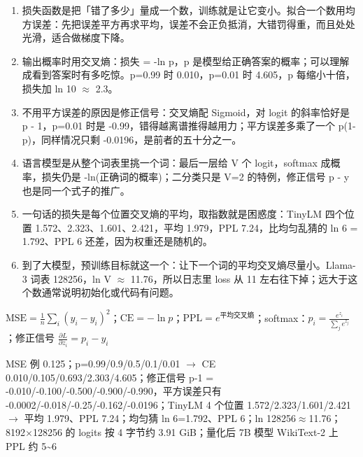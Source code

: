 \documentclass[UTF8,10.5pt,openany]{ctexbook}
\newcommand{\qlabel}[1]{{\sffamily\footnotesize\bfseries\color{accent}#1}\;}
\newcommand{\numline}[2]{\vspace{2pt}\noindent{\qlabel{#1}}%
  \begingroup\sloppy\raggedright{\sffamily\footnotesize\color{grayt}#2\par}\endgroup}
\begin{document}
\noindent{\qlabel{答}}\begingroup\sloppy\begin{enumerate}[leftmargin=1.6em,itemsep=2.5pt,topsep=0pt,parsep=0pt,label={\sffamily\footnotesize\color{accent}\arabic*.}]
\item {\fontsize{10}{14.8}\selectfont 损失函数是把「错了多少」量成一个数，训练就是让它变小。拟合一个数用均方误差：先把误差平方再求平均，误差不会正负抵消，大错罚得重，而且处处光滑，适合做梯度下降。\par}
\item {\fontsize{10}{14.8}\selectfont 输出概率时用交叉熵：损失 = -ln p，p 是模型给正确答案的概率；可以理解成看到答案时有多吃惊。p=0.99 时 0.010，p=0.01 时 4.605，p 每缩小十倍，损失加 ln 10 $\approx$ 2.3。\par}
\item {\fontsize{10}{14.8}\selectfont 不用平方误差的原因是修正信号：交叉熵配 Sigmoid，对 logit 的斜率恰好是 p - 1，p=0.01 时是 -0.99，错得越离谱推得越用力；平方误差多乘了一个 p(1-p)，同样情况只剩 -0.0196，是前者的五十分之一。\par}
\item {\fontsize{10}{14.8}\selectfont 语言模型是从整个词表里挑一个词：最后一层给 V 个 logit，softmax 成概率，损失仍是 -ln(正确词的概率)；二分类只是 V=2 的特例，修正信号 p - y 也是同一个式子的推广。\par}
\item {\fontsize{10}{14.8}\selectfont 一句话的损失是每个位置交叉熵的平均，取指数就是困惑度：TinyLM 四个位置 1.572、2.323、1.601、2.421，平均 1.979，PPL 7.24，比均匀乱猜的 ln 6 = 1.792、PPL 6 还差，因为权重还是随机的。\par}
\item {\fontsize{10}{14.8}\selectfont 到了大模型，预训练目标就这一个：让下一个词的平均交叉熵尽量小。Llama-3 词表 128256，ln V $\approx$ 11.76，所以日志里 loss 从 11 左右往下掉；远大于这个数通常说明初始化或代码有问题。\par}
\end{enumerate}\endgroup
\numline{公式}{$\text{MSE}=\frac{1}{n}\sum_{i}(\hat{y}_i-y_i)^2$；$\text{CE}=-\ln p$；$\text{PPL}=e^{\text{平均交叉熵}}$；softmax：$p_i=\frac{e^{z_i}}{\sum_{j}e^{z_j}}$；修正信号 $\frac{\partial L}{\partial z_i}=p_i-y_i$}
\numline{数字}{MSE 例 0.125；p=0.99/0.9/0.5/0.1/0.01 $\rightarrow$ CE 0.010/0.105/0.693/2.303/4.605；修正信号 p-1 = -0.010/-0.100/-0.500/-0.900/-0.990，平方误差只有 -0.0002/-0.018/-0.25/-0.162/-0.0196；TinyLM 4 个位置 1.572/2.323/1.601/2.421 $\rightarrow$ 平均 1.979、PPL 7.24；均匀猜 ln 6=1.792、PPL 6；ln 128256$\approx$11.76；8192$\times$128256 的 logits 按 4 字节约 3.91 GiB；量化后 7B 模型 WikiText-2 上 PPL 约 5\textasciitilde{}6}
\end{document}
